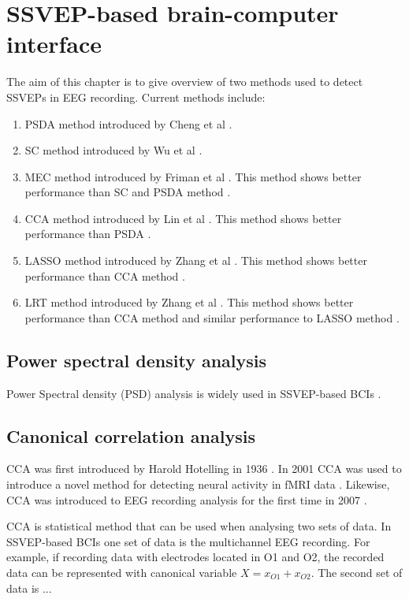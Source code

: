 \section{SSVEP-based brain-computer interface}
\label{sec:SSVEP_detection}
The aim of this chapter is to give overview of two methods used to detect \glspl{SSVEP} in \gls{EEG} recording. Current methods include:
\begin{enumerate}
	\item \gls{PSDA} method introduced by Cheng et al \cite{psda}.
	\item \gls{SC} method introduced by Wu et al \cite{sc}.
	\item \gls{MEC} method introduced by Friman et al \cite{mec}. This method shows better performance than \gls{SC} and \gls{PSDA} method \cite{mec_comparison}.
	\item \gls{CCA} method introduced by Lin et al \cite{cca_lin}. This method shows better performance than \gls{PSDA} \cite{bin2009cca}.
	\item \gls{LASSO} method introduced by Zhang et al \cite{LASSO}. This method shows better performance than \gls{CCA} method \cite{LASSO}.
	\item \gls{LRT} method introduced by Zhang et al \cite{LRT}. This method shows better performance than \gls{CCA} method and similar performance to \gls{LASSO} method \cite{LRT}.
\end{enumerate}

\subsection{Power spectral density analysis}

Power Spectral density (PSD) analysis is widely used in \gls{SSVEP}-based \glspl{BCI} \cite{bin2009cca}.

\subsection{Canonical correlation analysis}

\Gls{CCA} was first introduced by Harold Hotelling in 1936 \cite{cca_hotelling}. In 2001 \gls{CCA} was used to introduce a novel method for detecting neural activity in \gls{fMRI} data \cite{cca_fmri}. Likewise, \gls{CCA} was introduced to \gls{EEG} recording analysis for the first time in 2007 \cite{cca_lin}. 

\Gls{CCA} is statistical method that can be used when analysing two sets of data. In \gls{SSVEP}-based \glspl{BCI} one set of data is the multichannel \gls{EEG} recording. For example, if recording data with electrodes located in O1 and O2, the recorded data can be represented with canonical variable $X=x_{O1}+x_{O2}$. The second set of data is ...
